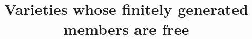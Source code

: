 
\usepackage{amsmath,amsthm,amsfonts,latexsym,amssymb,amscd,color}
\usepackage{chemarr}
\pagestyle{headings}
\setlength{\textwidth}{36true pc}
\setlength{\headheight}{8true pt} 
\setlength{\oddsidemargin}{0 truept}
\setlength{\evensidemargin}{0 truept}
\setlength{\textheight}{572true pt}
\newtheorem{thm}{Theorem}[section] 
\newtheorem{cor}[thm]{Corollary}
\newtheorem{lm}[thm]{Lemma}
\newtheorem{prp}[thm]{Proposition}
\newtheorem{clm}[thm]{Claim}
\newtheorem*{clm*}{Claim}
\theoremstyle{definition}
\newtheorem{df}[thm]{Definition}
\newtheorem{dfs}[thm]{Definitions}
\newtheorem{exmp}[thm]{Example}
\newtheorem{exmps}[thm]{Examples}
\newtheorem{remark}[thm]{Remark}
\newtheorem{prb}[thm]{Problem}
\newtheorem{quest}[thm]{Question}

 

\newenvironment{spf}{\noindent{\it Proof.}}{\hfill\rule{1.3mm}{3mm}\medskip}
 

\newenvironment{cpf}{\noindent{\it Proof of Claim.}\ }{\hfill\rule{1.3mm}{3mm}}

 
                                           
 
                                           
  
                                           
 
     

                                           

                                           

 
 
 
 
 
         
         

  
   
 

 
  
     

 

 
 

 

  



\title{Varieties whose finitely generated members are free}


